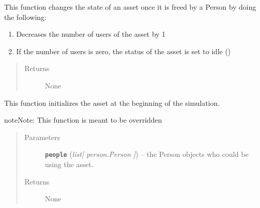 \documentclass[letterpaper,10pt,english]{sphinxmanual}
\begin{document}
\begin{fulllineitems}
\begin{quote}
\begin{description}
\begin{itemize}
\end{itemize}

\end{description}\end{quote}

\begin{fulllineitems}
\label{asset:asset.Asset.free}
This function changes the state of an asset once it is freed by a Person by doing the following:
\begin{enumerate}
\item {} 
Decreases the number of users of the asset by 1

\item {} 
If the number of users is zero, the status of the asset is set to idle ()

\end{enumerate}
\begin{quote}\begin{description}
\item[{Returns}] \leavevmode
None

\end{description}\end{quote}

\end{fulllineitems}


\begin{fulllineitems}
\label{asset:asset.Asset.initialize}
This function initializes the asset at the beginning of the simulation.

\begin{notice}{note}{Note:}
This function is meant to be overridden
\end{notice}
\begin{quote}\begin{description}
\item[{Parameters}] \leavevmode
\textbf{\texttt{people}} (\emph{list{[} person.Person {]}}) -- the Person objects who could be using the asset.

\item[{Returns}] \leavevmode
None

\end{description}\end{quote}

\end{fulllineitems}


\end{fulllineitems}
\end{document}
